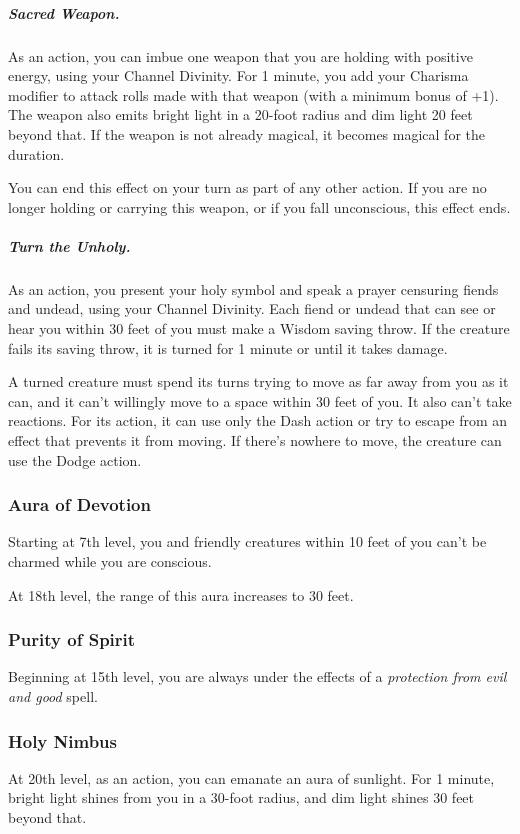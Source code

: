 \subparagraph*{Sacred Weapon.} As an action, you can imbue one weapon that you are holding with positive energy, using your Channel Divinity. For 1 minute, you add your Charisma modifier to attack rolls made with that weapon (with a minimum bonus of +1). The weapon also emits bright light in a 20-foot radius and dim light 20 feet beyond that. If the weapon is not already magical, it becomes magical for the duration.

You can end this effect on your turn as part of any other action. If you are no longer holding or carrying this weapon, or if you fall unconscious, this effect ends.

\subparagraph*{Turn the Unholy.} As an action, you present your holy symbol and speak a prayer censuring fiends and undead, using your Channel Divinity. Each fiend or undead that can see or hear you within 30 feet of you must make a Wisdom saving throw. If the creature fails its saving throw, it is turned for 1 minute or until it takes damage.

A turned creature must spend its turns trying to move as far away from you as it can, and it can't willingly move to a space within 30 feet of you. It also can't take reactions. For its action, it can use only the Dash action or try to escape from an effect that prevents it from moving. If there's nowhere to move, the creature can use the Dodge action.

\subsubsection{Aura of Devotion}

Starting at 7th level, you and friendly creatures within 10 feet of you can't be charmed while you are conscious.

At 18th level, the range of this aura increases to 30 feet.

\subsubsection{Purity of Spirit}

Beginning at 15th level, you are always under the effects of a \textit{protection from evil and good} spell.

\subsubsection{Holy Nimbus}

At 20th level, as an action, you can emanate an aura of sunlight. For 1 minute, bright light shines from you in a 30-foot radius, and dim light shines 30 feet beyond that.

